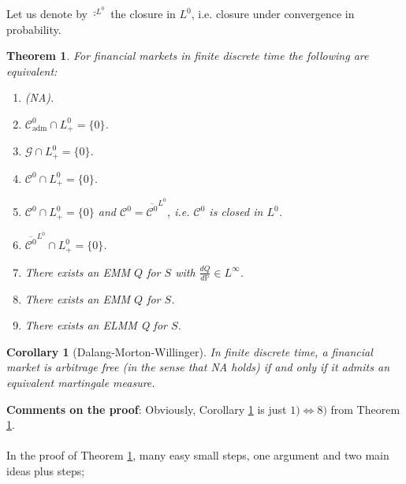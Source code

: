 \documentclass[12pt,a4paper, twoside]{article}
\newtheorem{thm}{Theorem}[section]
\newtheorem{cor}{Corollary}[section]
\theoremstyle{definition}
\newcommand{\PP}{\mathbb{P}} %
\begin{document}
Let us denote by $\bar{\cdot}^{L^0}$ the closure in $L^0$, i.e. closure under convergence in probability. 
\newpage
\begin{thm} \label{T12} For financial markets in finite discrete time the following are equivalent:
\begin{enumerate}
\item (NA).
\item $\mathcal{C}_\text{adm}^0 \cap L_+^0 = \{0\}$.
\item $\mathcal{G} \cap L_+^0 = \{0\}$.
\item $\mathcal{C}^0 \cap L_+^0 = \{0 \}$.
\item $\mathcal{C}^0 \cap L_+^0 = \{0\}$ and $\mathcal{C}^0 = \overline{\mathcal{C}^0}^{L^0}$, i.e. $\mathcal{C}^0$ is closed in $L^0$. 
\item $\overline{\mathcal{C}^0}^{L^0} \cap L_+^0 = \{0\}$.
\item There exists an EMM $Q$ for $S$ with $\frac{dQ}{d \PP} \in L^\infty$.
\item There exists an EMM $Q$ for $S$.
\item There exists an ELMM Q for $S$.
\end{enumerate}
\end{thm}
\begin{mdframed}[backgroundcolor=yellow!20, topline=true, linewidth=2.0pt]
\begin{cor}[Dalang-Morton-Willinger] \label{C13} In finite discrete time, a financial market is arbitrage free (in the sense that NA holds) if and only if it admits an equivalent martingale measure. 
\end{cor}
\end{mdframed}
\noindent \textbf{Comments on the proof}: Obviously, Corollary \ref{C13} is just $1) \iff 8)$ from Theorem \ref{T12}. \\
\\
In the proof of Theorem \ref{T12}, many easy small steps, one argument and two main ideas plus steps;
\end{document}
